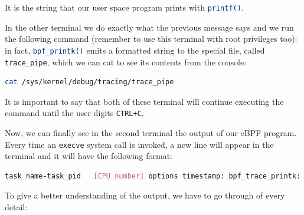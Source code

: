 It is the string that our user space program prints with \colorbox{backcolour}{\lstinline[style=commandline, language=bash, breaklines=true]|printf()|}. 

In the other terminal we do exactly what the previous message says and we run the following command (remember to use this terminal with root privileges too): in fact, \colorbox{backcolour}{\lstinline[style=commandline, language=bash, breaklines=true]|bpf_printk()|} emits a formatted string to the special file, called \colorbox{backcolour}{\lstinline[style=commandline, language=bash, breaklines=true]|trace_pipe|}, which we can cat to see its contents from the console:

\begin{lstlisting}[style=commandline, language=bash, caption={Command to start tracing the debug messages in libbpf-bootstrap.}]
	cat /sys/kernel/debug/tracing/trace_pipe
\end{lstlisting}

It is important to say that both of these terminal will continue executing the command until the user digits \colorbox{backcolour}{\lstinline[style=commandline, language=bash, breaklines=true]|CTRL+C|}.

Now, we can finally see in the second terminal the output of our eBPF program.
Every time an \colorbox{backcolour}{\lstinline[style=commandline, language=bash, breaklines=true]|execve|} system call is invoked, a new line will appear in the terminal and it will have the following format:

\begin{lstlisting}[style=commandline, language=bash, caption={\colorbox{backcolour}{\lstinline[style=commandline, language=bash]|bpf_printk()|} output message format in libbpf-bootstrap.}]
	task_name-task_pid   [CPU_number] options timestamp: bpf_trace_printk: invoke bpf_prog: Hello, World!
\end{lstlisting}

To give a better understanding of the output, we have to go through of every detail:

